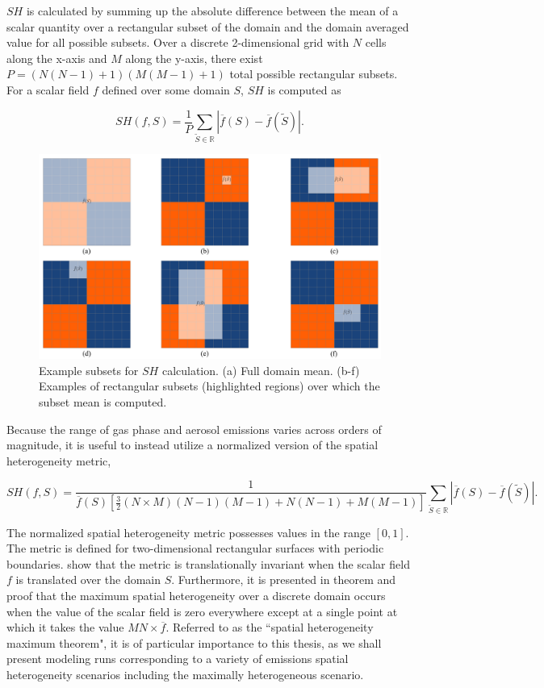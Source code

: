 $SH$ is calculated by summing up the absolute difference between the mean of a scalar quantity over a rectangular subset of the domain and the domain averaged value for all possible subsets. Over a discrete 2-dimensional grid with $N$ cells along the x-axis and $M$ along the y-axis, there exist \\$P=(N(N-1)+1)(M(M-1)+1)$ total possible rectangular subsets. For a scalar field $f$ defined over some domain $S$, $SH$ is computed as

\begin{equation}
SH(f, S) = \frac{1}{P}\sum_{\tilde{S}\in \mathbb{R}}|\overline{f}(S) - \overline{f}(\tilde{S})|.
\end{equation}

\begin{figure}[!t]
	\centering
	\includegraphics[width=\textwidth]{figures/chapter2/SH-subarray-examples.pdf}
	\caption{Example subsets for $SH$ calculation. (a) Full domain mean. (b-f) Examples of rectangular subsets (highlighted regions) over which the subset mean is computed.}
	\label{fig:sh-subarrays}
\end{figure}

Because the range of gas phase and aerosol emissions varies across orders of magnitude, it is useful to instead utilize a normalized version of the spatial heterogeneity metric,

\begin{equation}
SH(f, S) = \frac{1}{\overline{f}(S)\left[\frac{3}{2}(N\times M)(N-1)(M-1) + N(N-1) + M(M-1)\right]}\sum_{\tilde{S}\in \mathbb{R}}|\overline{f}(S) - \overline{f}(\tilde{S})|.
\end{equation}

The normalized spatial heterogeneity metric possesses values in the range $[0, 1]$. The metric is defined for two-dimensional rectangular surfaces with periodic boundaries. \textcite{mohebalhojeh_2024} show that the metric is translationally invariant when the scalar field $f$ is translated over the domain $S$. Furthermore, it is presented in theorem and proof that the maximum spatial heterogeneity over a discrete domain occurs when the value of the scalar field is zero everywhere except at a single point at which it takes the value $MN\times\overline{f}$. Referred to as the ``spatial heterogeneity maximum theorem", it is of particular importance to this thesis, as we shall present modeling runs corresponding to a variety of emissions spatial heterogeneity scenarios including the maximally heterogeneous scenario. 

